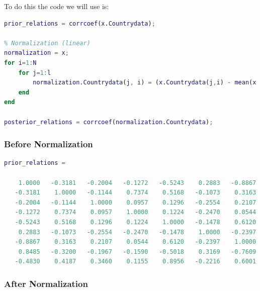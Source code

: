 \documentclass[12pt, a4paper]{article}
\begin{document}
To do this the code we will use is:
\begin{lstlisting}[language=Matlab, label=lst:Cross term, caption=Code that calculates the cross correlations of the data features before and after normalization.]
% We are going to consider all the pairs of data and vidualize them
prior_relations = corrcoef(x.Countrydata);

% Normalization (linear)
normalization = x;
for i=1:N
    for j=1:l
        normalization.Countrydata(j, i) = (x.Countrydata(j,i) - mean(x.Countrydata(:,i)))/(std(x.Countrydata(:, i)));
    end
end

posterior_relations = corrcoef(normalization.Countrydata);
\end{lstlisting}

\subsubsection{Before Normalization}

\begin{lstlisting}[language=Matlab, label=lst:prior, caption=The cross correlation output before normalization.]
prior_relations =

    1.0000   -0.3181   -0.2004   -0.1272   -0.5243    0.2883   -0.8867    0.8485   -0.4830
   -0.3181    1.0000   -0.1144    0.7374    0.5168   -0.1073    0.3163   -0.3200    0.4187
   -0.2004   -0.1144    1.0000    0.0957    0.1296   -0.2554    0.2107   -0.1967    0.3460
   -0.1272    0.7374    0.0957    1.0000    0.1224   -0.2470    0.0544   -0.1590    0.1155
   -0.5243    0.5168    0.1296    0.1224    1.0000   -0.1478    0.6120   -0.5018    0.8956
    0.2883   -0.1073   -0.2554   -0.2470   -0.1478    1.0000   -0.2397    0.3169   -0.2216
   -0.8867    0.3163    0.2107    0.0544    0.6120   -0.2397    1.0000   -0.7609    0.6001
    0.8485   -0.3200   -0.1967   -0.1590   -0.5018    0.3169   -0.7609    1.0000   -0.4549
   -0.4830    0.4187    0.3460    0.1155    0.8956   -0.2216    0.6001   -0.4549    1.0000
\end{lstlisting}

\subsubsection{After Normalization}
\end{document}
